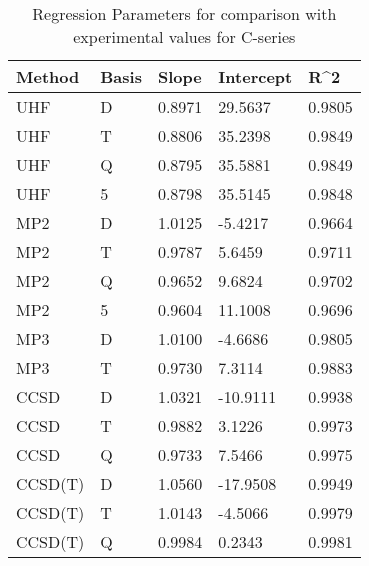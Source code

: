 \begin{table}
  \caption{Regression Parameters for comparison with experimental values for C-series}
  \label{tbl:regression-exp-c}
  \begin{tabular}{l l l l l }
    \hline
    Method & Basis & Slope & Intercept & R^2 \\ 
    \hline
    UHF & D & 0.8971 & 29.5637 & 0.9805 \\ 
    UHF & T & 0.8806 & 35.2398 & 0.9849 \\ 
    UHF & Q & 0.8795 & 35.5881 & 0.9849 \\ 
    UHF & 5 & 0.8798 & 35.5145 & 0.9848 \\ 
    MP2 & D & 1.0125 & -5.4217 & 0.9664 \\ 
    MP2 & T & 0.9787 & 5.6459 & 0.9711 \\ 
    MP2 & Q & 0.9652 & 9.6824 & 0.9702 \\ 
    MP2 & 5 & 0.9604 & 11.1008 & 0.9696 \\ 
    MP3 & D & 1.0100 & -4.6686 & 0.9805 \\ 
    MP3 & T & 0.9730 & 7.3114 & 0.9883 \\ 
    CCSD & D & 1.0321 & -10.9111 & 0.9938 \\ 
    CCSD & T & 0.9882 & 3.1226 & 0.9973 \\ 
    CCSD & Q & 0.9733 & 7.5466 & 0.9975 \\ 
    CCSD(T) & D & 1.0560 & -17.9508 & 0.9949 \\ 
    CCSD(T) & T & 1.0143 & -4.5066 & 0.9979 \\ 
    CCSD(T) & Q & 0.9984 & 0.2343 & 0.9981 \\ 
    \hline
  \end{tabular}
\end{table}
